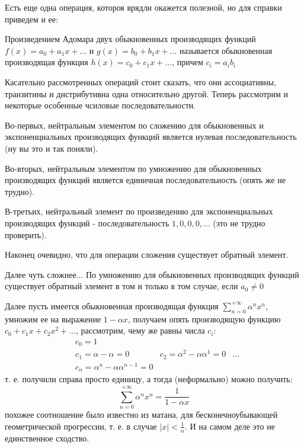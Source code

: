 Есть еще одна операция, котороя врядли окажется полезной, но для справки приведем и ее:

\begin{Def}
Произведением Адомара двух обыкновенных производящих функций $f\left(x\right) = a_0 + a_1 x + ...$ и $g\left(x\right) = b_0 + b_1 x + ...$ называется обыкновенная производящая функция $h\left(x\right) = c_0 + c_1 x + ...$, причем $c_i = a_i b_i$
\end{Def}

Касательно рассмотренных операций стоит сказать, что они ассоциативны, транзитины и дистрибутивна одна относительно другой. Теперь рассмотрим и некоторые особенные чсиловые последовательности.

Во-первых, нейтральным элементом по сложению для обыкновенных и экспоненциальных производящих функций является нулевая последовательность (ну вы это и так поняли).

Во-вторых, нейтральным элементом по умножению для обыкновенных производящих функций является единичная последовательность (опять же не трудно).

В-третьих, нейтральный элемент по произведению для экспоненциальных производящих функций - последовательность $1, 0, 0, 0 ,... $ (это не трудно проверить).

Наконец очевидно, что для операции сложения существует обратный элемент.

Далее чуть сложнее... По умножению для обыкновенных производящих функций существует обратный элемент в том и только в том случае, если $a_0 \not= 0$

Далее пусть имеется обыкновенная производящая функция $\sum_{n=0}^{+\infty} \alpha^n x^n$, умножим ее на выражение $1 - \alpha x$, получаем опять производящую функцию $c_0 + c_1 x + c_2 x^2 + ...$, рассмотрим, чему же равны числа $c_i$:
\[
	\begin{split}
		& c_0 = 1 \\
		& c_1 = \alpha - \alpha = 0
		& c_2 = \alpha^2 - \alpha \alpha^1 = 0
		& ... \\
		& c_n = \alpha^n - \alpha \alpha^{n-1} = 0
	\end{split}
\]
т. е. получили справа просто единицу, а тогда (неформально) можно получить:
\[
	\sum_{n=0}^{+\infty} \alpha^n x^n = \frac{1}{1-\alpha x}
\]
похожее соотношение было известно из матана, для бесконечноубывающей геометрической прогрессии, т. е. в случае $\left|x\right| < \frac{1}{\alpha}$. И на самом деле это не единственное сходство.

